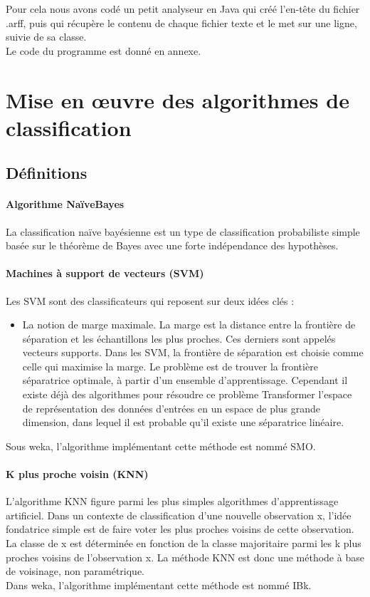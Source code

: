 \documentclass[a4paper,11pt]{article}
\begin{document}
Pour cela nous avons codé un petit analyseur en Java qui créé l’en-tête du fichier .arff, puis qui récupère le contenu de chaque fichier texte et le met sur une ligne, suivie de sa classe.\\Le code du programme est donné en annexe.

\newpage
\section{Mise en œuvre des algorithmes de classification}
\subsection{Définitions}
\paragraph{Algorithme NaïveBayes}
La classification naïve bayésienne est un type de classification probabiliste simple basée sur le théorème de Bayes avec une forte indépendance des hypothèses.

\paragraph{Machines à support de vecteurs (SVM)}
Les SVM sont des classificateurs qui reposent sur deux idées clés :
\begin{itemize}
\item La notion de marge maximale. La marge est la distance entre la frontière de séparation et les échantillons les plus proches. Ces derniers sont appelés vecteurs supports. Dans les SVM, la frontière de séparation est choisie comme celle qui maximise la marge. Le problème est de trouver la frontière séparatrice optimale, à partir d’un ensemble d’apprentissage. Cependant il existe déjà des algorithmes pour résoudre ce problème
Transformer l’espace de représentation des données d’entrées en un espace de plus grande dimension, dans lequel il est probable qu’il existe une séparatrice linéaire.
\end{itemize}
Sous weka, l’algorithme implémentant cette méthode est nommé SMO.

\paragraph{K plus proche voisin (KNN)}
L’algorithme KNN figure parmi les plus simples algorithmes d’apprentissage artificiel. Dans un contexte de classification d’une nouvelle observation x, l’idée fondatrice simple est de faire voter les plus proches voisins de cette observation. La classe de x est déterminée en fonction de la classe majoritaire parmi les k plus proches voisins de l’observation x. La méthode KNN est donc une méthode à base de voisinage, non paramétrique.\\Dans weka, l’algorithme implémentant cette méthode est nommé IBk.
\end{document}

